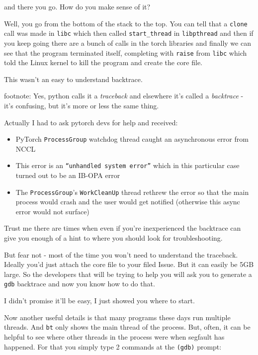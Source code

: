 \documentclass[
]{report}
\providecommand{\tightlist}{%
  \setlength{\itemsep}{0pt}\setlength{\parskip}{0pt}}\usepackage{longtable,booktabs,array}
\begin{document}
and there you go. How do you make sense of it?

Well, you go from the bottom of the stack to the top. You can tell that
a \texttt{clone} call was made in \texttt{libc} which then called
\texttt{start\_thread} in \texttt{libpthread} and then if you keep going
there are a bunch of calls in the torch libraries and finally we can see
that the program terminated itself, completing with \texttt{raise} from
\texttt{libc} which told the Linux kernel to kill the program and create
the core file.

This wasn't an easy to understand backtrace.

footnote: Yes, python calls it a \emph{traceback} and elsewhere it's
called a \emph{backtrace} - it's confusing, but it's more or less the
same thing.

Actually I had to ask pytorch devs for help and received:

\begin{itemize}
\tightlist
\item
  PyTorch \texttt{ProcessGroup} watchdog thread caught an asynchronous
  error from NCCL
\item
  This error is an \texttt{“unhandled\ system\ error”} which in this
  particular case turned out to be an IB-OPA error
\item
  The \texttt{ProcessGroup}'s \texttt{WorkCleanUp} thread rethrew the
  error so that the main process would crash and the user would get
  notified (otherwise this async error would not surface)
\end{itemize}

Trust me there are times when even if you're inexperienced the backtrace
can give you enough of a hint to where you should look for
troubleshooting.

But fear not - most of the time you won't need to understand the
traceback. Ideally you'd just attach the core file to your filed Issue.
But it can easily be 5GB large. So the developers that will be trying to
help you will ask you to generate a \texttt{gdb} backtrace and now you
know how to do that.

I didn't promise it'll be easy, I just showed you where to start.

Now another useful details is that many programs these days run multiple
threads. And \texttt{bt} only shows the main thread of the process. But,
often, it can be helpful to see where other threads in the process were
when segfault has happened. For that you simply type 2 commands at the
\texttt{(gdb)} prompt:
\end{document}
